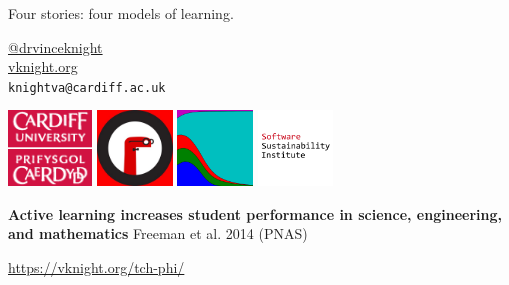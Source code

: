 \documentclass{beamer}
\begin{document}
    \begin{frame}
        \begin{center}
            \Large

            Four stories: four models of learning.

            \normalsize
            \vspace{1cm}
            \href{https://twitter.com/drvinceknight}{@drvinceknight}\\
            \url{vknight.org}\\
            \texttt{knightva@cardiff.ac.uk}
        \end{center}


    \end{frame}

    \begin{frame}
        \centering

        \includegraphics[height=2cm]{static/CUident_CMYK.eps}
        \hfill
        \includegraphics[height=2cm]{static/pyconuk.jpg}
        \hfill
        \includegraphics[height=2cm]{static/axelrod_logo.png}
        \hfill
        \includegraphics[height=2cm]{static/ssi-logo.png}
    \end{frame}

    \begin{frame}
        \begin{center}
            \textbf{Active learning increases student performance in
            science, engineering, and mathematics} Freeman et al. 2014 (PNAS)
        \end{center}

        \begin{center}
            \url{https://vknight.org/tch-phi/}
        \end{center}
    \end{frame}
\end{document}
